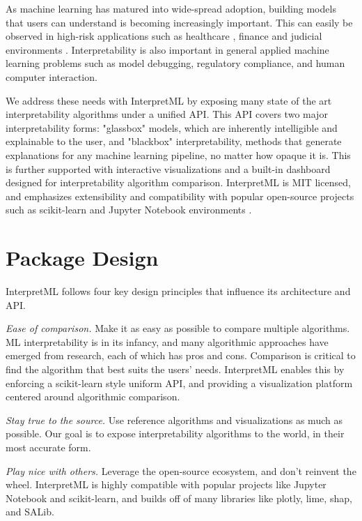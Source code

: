 \documentclass[twoside,11pt]{article}
\begin{document}
As machine learning has matured into wide-spread adoption, building models that users can understand is becoming increasingly important. This can easily be observed in high-risk applications such as healthcare \citep{ahmad2018interpretable, caruana2015intelligible}, finance \citep{hajek2019interpretable, chen2018interpretable} and judicial environments \citep{Tan:2018:DAB:3278721.3278725, soundarajanequal}. Interpretability is also important in general applied machine learning problems such as model debugging, regulatory compliance, and human computer interaction.

We address these needs with InterpretML by exposing many state of the art interpretability algorithms under a unified API. This API covers two major interpretability forms: "glassbox" models, which are inherently intelligible and explainable to the user, and "blackbox" interpretability, methods that generate explanations for any machine learning pipeline, no matter how opaque it is. This is further supported with interactive visualizations and a built-in dashboard designed for interpretability algorithm comparison. InterpretML is MIT licensed, and emphasizes extensibility and compatibility with popular open-source projects such as scikit-learn \citep{scikit-learn} and Jupyter Notebook environments \citep{Kluyver:2016aa}.

\section{Package Design}

InterpretML follows four key design principles that influence its architecture and API.

\textit{Ease of comparison.} Make it as easy as possible to compare multiple algorithms. ML interpretability is in its infancy, and many algorithmic approaches have emerged from research, each of which has pros and cons. Comparison is critical to find the algorithm that best suits the users' needs. InterpretML enables this by enforcing a scikit-learn style uniform API, and providing a visualization platform centered around algorithmic comparison. 

\textit{Stay true to the source.} Use reference algorithms and visualizations as much as possible. Our goal is to expose interpretability algorithms to the world, in their most accurate form. 

\textit{Play nice with others.} Leverage the open-source ecosystem, and don't reinvent the wheel. InterpretML is highly compatible with popular projects like Jupyter Notebook and scikit-learn, and builds off of many libraries like plotly, lime, shap, and SALib.
\end{document}
